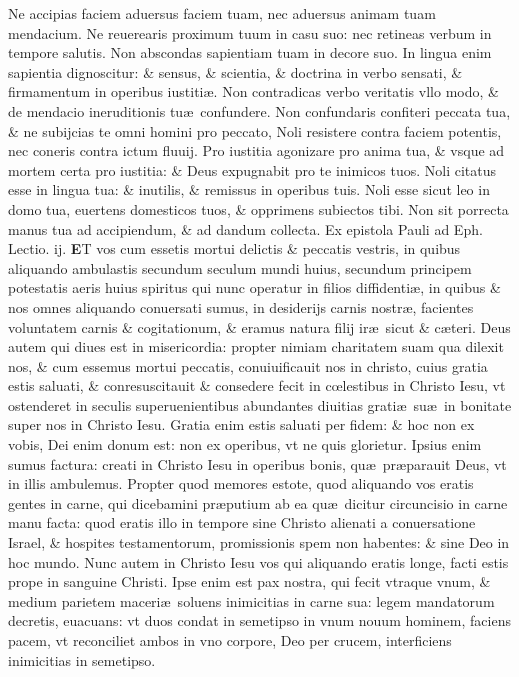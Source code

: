 \documentclass[a5paper,10pt]{book}
\def\rightmarginnote{%
	\lrmarginnote{\hskip\columnwidth \hskip -1em}}
\def\ae{æ}
\def\oe{œ}
\begin{document}
\begin{multicols*}{2}
Ne accipias faciem aduersus faciem tuam, nec aduersus animam tuam mendacium. Ne reuerearis proximum tuum in casu suo: nec retineas verbum in tempore salutis.
Non abscondas sapientiam tuam in decore suo. In lingua enim sapientia dignoscitur: \& sensus, \& scientia, \& doctrina in verbo sensati, \& firmamentum in operibus iustiti\ae .
Non contradicas verbo veritatis vllo modo, \& de mendacio ineruditionis tu\ae \ confundere.
Non confundaris confiteri peccata tua, \& ne subijcias te omni homini pro peccato, Noli resistere contra faciem potentis, nec coneris contra ictum fluuij.
Pro iustitia agonizare pro anima tua, \& vsque ad mortem certa pro iustitia: \& Deus expugnabit pro te inimicos tuos.
Noli citatus esse in lingua tua: \& inutilis, \& remissus in operibus tuis. Noli esse sicut leo in domo tua, euertens domesticos tuos, \& opprimens subiectos tibi.
Non sit porrecta manus tua ad accipiendum, \& ad dandum collecta.
\fancyhead[C]{\color{red} Feria. ij. Dominic\ae . ij. Vagantium}
\newline {} \color{red} Ex epistola Pauli ad Eph. \hfill Lectio. ij. \color{black}
\vspace{-2.25em}
\lettrine[lines=2]{\bfseries \color{red} E}{}T\rightmarginnote{ca. 2.} vos cum essetis mortui delictis \& peccatis vestris, in quibus aliquando ambulastis secundum seculum mundi huius, secundum principem potestatis aeris huius spiritus qui nunc operatur in filios diffidenti\ae , in quibus \& nos omnes aliquando
conuersati sumus, in desiderijs carnis nostr\ae , facientes voluntatem carnis \& cogitationum, \& eramus natura filij ir\ae \ sicut \& c\ae teri.
Deus autem qui diues est in misericordia: propter nimiam charitatem suam qua dilexit nos, \& cum essemus mortui peccatis, conuiuificauit nos in christo, cuius gratia estis saluati, \& conresuscitauit \& consedere fecit in c\oe lestibus in Christo Iesu, vt ostenderet in seculis superuenientibus abundantes diuitias grati\ae \ su\ae \ in bonitate super nos in Christo Iesu.
Gratia enim estis saluati per fidem: \& hoc non ex vobis, Dei enim donum est: non ex operibus, vt ne quis glorietur.
Ipsius enim sumus factura: creati in Christo Iesu in operibus bonis, qu\ae \ pr\ae parauit Deus, vt in illis ambulemus.
Propter quod memores estote, quod aliquando vos eratis gentes in carne, qui dicebamini pr\ae putium ab ea qu\ae \ dicitur circuncisio in carne manu facta: quod eratis illo in tempore sine Christo alienati a conuersatione Israel, \& hospites testamentorum, promissionis spem non habentes: \& sine Deo in hoc mundo.
Nunc autem in Christo Iesu vos qui aliquando eratis longe, facti estis prope in sanguine Christi. Ipse enim est pax nostra, qui fecit vtraque vnum, \& medium parietem maceri\ae \ soluens inimicitias in carne sua: legem mandatorum decretis, euacuans: vt duos condat in semetipso in vnum nouum hominem, faciens pacem, vt reconciliet ambos in vno corpore, Deo per crucem, interficiens inimicitias in semetipso.

\end{multicols*}
\end{document}
